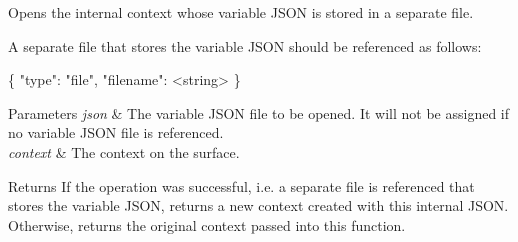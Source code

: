 Opens the internal context whose variable J\+S\+ON is stored in a separate file. 

A separate file that stores the variable J\+S\+ON should be referenced as follows\+: 
\begin{DoxyCode}
\{
  \textcolor{stringliteral}{"type"}: \textcolor{stringliteral}{"file"},
  \textcolor{stringliteral}{"filename"}: <\textcolor{keywordtype}{string}>
\}
\end{DoxyCode}
 
\begin{DoxyParams}{Parameters}
{\em json} & The variable J\+S\+ON file to be opened. It will not be assigned if no variable J\+S\+ON file is referenced. \\
\hline
{\em context} & The context on the surface. \\
\hline
\end{DoxyParams}
\begin{DoxyReturn}{Returns}
If the operation was successful, i.\+e. a separate file is referenced that stores the variable J\+S\+ON, returns a new context created with this internal J\+S\+ON. Otherwise, returns the original context passed into this function. 
\end{DoxyReturn}
